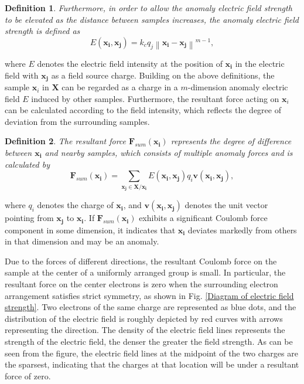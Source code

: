 \documentclass[times, review, 10pt]{elsarticle}
\newtheorem{definition}{Definition}
\begin{document}
\begin{definition}
Furthermore, in order to allow the anomaly electric field strength to be elevated as the distance between samples increases, the anomaly electric field strength \cite{zhu2022high} is defined as 
\begin{equation}
E(\boldsymbol{x_{i}},\boldsymbol{x_{j}})=k_c q_{j}\left\|\boldsymbol{x_i}-\boldsymbol{x_j}\right\|^{m-1},
\end{equation}
\end{definition}
{where $E$ denotes the electric field intensity at the position of $\boldsymbol{x_{i}}$ in the electric field with $\boldsymbol{x_{j}}$ as a field source charge.}
Building on the above definitions, the sample $\boldsymbol{x}_{i}$ in $\boldsymbol{X}$ can be regarded as a charge in a $m$-dimension anomaly electric field $E$ induced by other samples. Furthermore, the resultant force acting on $\boldsymbol{x}_{i}$ can be calculated according to the field intensity, which reflects the degree of deviation from the surrounding samples.

\begin{definition}
{
The resultant force ${\boldsymbol{F}_{sum}(\boldsymbol{x_i})}$ represents the degree of difference between $\boldsymbol{x_i}$ and nearby samples, which consists of multiple anomaly forces and is calculated by
\begin{equation}
{\boldsymbol{F}_{sum}(\boldsymbol{x_{i}})}=\sum_{\boldsymbol{{x_j}} \in \boldsymbol{X} / \boldsymbol{x_i}} E(\boldsymbol{x_i}, \boldsymbol{x_j})q_{i}\boldsymbol{v}(\boldsymbol{x_i}, \boldsymbol{x_j}),
\end{equation}}
\end{definition}
where $q_{i}$ denotes the charge of $\boldsymbol{x_{i}}$, and $\boldsymbol{v}(\boldsymbol{x_i}, \boldsymbol{x_j})$ denotes the unit vector pointing from $\boldsymbol{x_j}$ to $\boldsymbol{x_i}$.
If ${\boldsymbol{F}_{sum}(\boldsymbol{x_i})}$ exhibits a significant Coulomb force component in some dimension, it indicates that $\boldsymbol{x_i}$ deviates markedly from others in that dimension and may be an anomaly.

Due to the forces of different directions, the resultant Coulomb force on the sample at the center of a uniformly arranged group is small. In particular, the resultant force on the center electrons is zero when the surrounding electron arrangement satisfies strict symmetry, as shown in Fig. \ref{Diagram of electric field strength}. Two electrons of the same charge are represented as blue dots, and the distribution of the electric field is roughly depicted by red curves with arrows representing the direction. The density of the electric field lines represents the strength of the electric field, the denser the greater the field strength. {As can be seen from the figure, the electric field lines at the midpoint of the two charges are the sparsest, indicating that the charges at that location will be under a resultant force of zero.}
\end{document}
